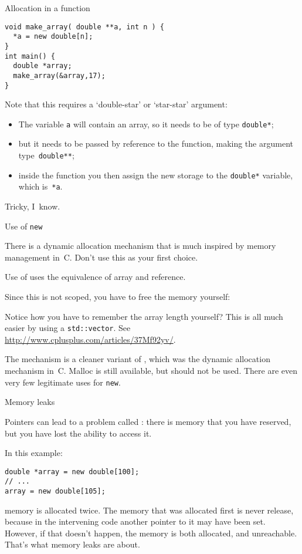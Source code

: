 \begin{block}{Allocation in a function}
\begin{lstlisting}
void make_array( double **a, int n ) {
  *a = new double[n];
}
int main() {
  double *array;
  make_array(&array,17);
}
\end{lstlisting}
\end{block}

Note that this requires a `double-star' or `star-star' argument:
\begin{itemize}
\item The variable \lstinline{a} will contain an array, so it needs to be of
  type \lstinline{double*};
\item but it needs to be passed by reference to the function, making
  the argument type~\lstinline{double**};
\item inside the function you then assign the new storage to the
  \lstinline{double*} variable, which is~\lstinline{*a}.
\end{itemize}
Tricky, I~know.

 {Use of \texttt{new}}
\label{sec:cnew}

\prerequisite{\ref{sec:arraypointer}}

There is a dynamic allocation mechanism that is much inspired by
memory management in~C. Don't use this as your first choice.

Use of  uses the 
equivalence of array and reference.
%

Since this is not scoped, you have to free the memory yourself:
%

Notice how you have to remember the array length yourself? This is all
much easier by using a \lstinline{std::vector}. See
\url{http://www.cplusplus.com/articles/37Mf92yv/}.

The  mechanism is a cleaner variant of ,
which was the dynamic allocation mechanism in~C. Malloc is still
available, but should not be used. There are even very few legitimate
uses for \lstinline{new}.


 {Memory leaks}
\label{sec:memleak}

Pointers can lead to a problem called :
there is memory that you have reserved, but you have lost the ability
to access it.

In this example:
\begin{lstlisting}
double *array = new double[100];
// ...
array = new double[105];
\end{lstlisting}
memory is allocated twice. The memory that was allocated first is
never release, because in the intervening code another pointer to it
may have been set. However, if that doesn't happen, the memory is both
allocated, and unreachable. That's what memory leaks are about.

